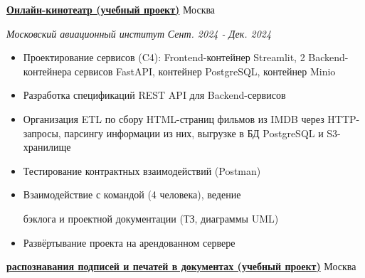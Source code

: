 \documentclass[14pt, a4paper, oneside]{extarticle}
\begin{document}

\begin{flushleft}
	\vspace{-\intextsep}
	\quad
	\href{https://github.com/Crazy5202/Python_project}{\textbf{Онлайн-кинотеатр (учебный проект)}}
	\hfill
	Москва
\end{flushleft}

\begin{flushleft}
	\vspace{-1\intextsep}
	\quad
	\textit{Московский авиационный институт}
	\hfill
	\textit{\small Сент. 2024 - Дек. 2024}
\end{flushleft}


\begin{itemize}
	\vspace{-2\intextsep}
	\item Проектирование сервисов (C4): Frontend-контейнер Streamlit, 2 Backend-контейнера сервисов FastAPI, контейнер PostgreSQL, контейнер Minio
	\vspace{-0.8\intextsep}
	\item Разработка спецификаций REST API для Backend-сервисов
	\vspace{-0.8\intextsep}
	\item Организация ETL по сбору HTML-страниц фильмов из IMDB через HTTP-запросы,
    парсингу информации из них, выгрузке в БД PostgreSQL и S3-хранилище
	\vspace{-2\intextsep}
    \item Тестирование контрактных взаимодействий (Postman)
	\vspace{-0.8\intextsep}
    \item Взаимодействие с командой (4 человека), ведение 

    \vspace{-0.5\intextsep}
    бэклога и проектной документации (ТЗ, диаграммы UML)
    \vspace{-0.8\intextsep}
    \item Развёртывание проекта на арендованном сервере
\end{itemize}


\begin{flushleft}
	\vspace{-0.8\intextsep}
	\quad
	\href{https://github.com/Crazy5202/CM_2024}{\textbf{ распознавания подписей и печатей в документах (учебный проект)}}
	\hfill
	Москва
\end{flushleft}
\end{document}
